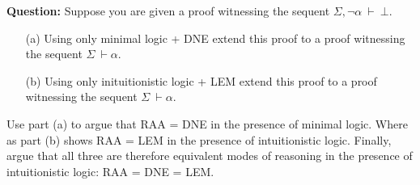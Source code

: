 \documentclass[11pt]{report}
\begin{document}
\begin{enumerate}
	\textbf{Question:} Suppose you are given a proof witnessing the sequent $\Sigma, \lnot \alpha \ \vdash \ \bot$. 

	\begin{itemize}
		\item[(a)] Using only minimal logic + DNE extend this proof to a proof witnessing the sequent $ \Sigma \ \vdash \alpha$. 
		\item[(b)] Using only inituitionistic logic + LEM extend this proof to a proof witnessing the sequent $ \Sigma \ \vdash \alpha$. 
	\end{itemize}

	Use part (a) to argue that RAA = DNE in the presence of minimal logic. Where as part (b) shows RAA = LEM in the presence of intuitionistic logic. Finally, argue that all three are therefore equivalent modes of reasoning in the presence of intuitionistic logic: RAA = DNE = LEM.		

	\end{enumerate}	
\end{document}

